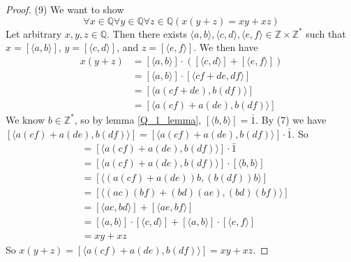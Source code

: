 \documentclass{report}
\begin{document}
\begin{proof}(9)
We want to show
\begin{equation*}
\forall x\in\mathbb Q\forall y\in\mathbb Q\forall z\in\mathbb Q(x(y+z)=xy+xz)
\end{equation*}
Let arbitrary $x,y,z\in\mathbb Q$. Then there exists $\langle a,b\rangle,\langle c,d\rangle,\langle e,f\rangle\in\mathbb Z\times\mathbb Z^*$ such that 
$x=[\langle a,b\rangle]$, $y=[\langle c,d\rangle]$, and $z=[\langle e,f\rangle]$. We then have
\begin{align*}
x(y+z)&=[\langle a,b\rangle]\cdot([\langle c,d\rangle]+[\langle e,f\rangle])\\
&=[\langle a,b\rangle]\cdot[\langle cf+de,df\rangle]\\
&=[\langle a(cf+de),b(df)\rangle]\\
&=[\langle a(cf)+a(de),b(df)\rangle]
\end{align*}
We know $b\in\mathbb Z^*$, so by lemma \ref{Q_1_lemma}, $[\langle b,b\rangle]=\bar1$. By (7) we have
$[\langle a(cf)+a(de),b(df)\rangle]=[\langle a(cf)+a(de),b(df)\rangle]\cdot\bar1$. So
\begin{align*}
[\langle a(cf)+a(de),b(df)\rangle]&=[\langle a(cf)+a(de),b(df)\rangle]\cdot\bar1\\
&=[\langle a(cf)+a(de),b(df)\rangle]\cdot[\langle b,b\rangle]\\
&=[\langle(a(cf)+a(de))b,(b(df))b\rangle]\\
&=[\langle(ac)(bf)+(bd)(ae),(bd)(bf)\rangle]\\
&=[\langle ac,bd\rangle]+[\langle ae,bf\rangle]\\
&=[\langle a,b\rangle]\cdot[\langle c,d\rangle]+[\langle a,b\rangle]\cdot[\langle e,f\rangle]\\
&=xy+xz
\end{align*}
So $x(y+z)=[\langle a(cf)+a(de),b(df)\rangle]=xy+xz$.
\end{proof}
\end{document}

